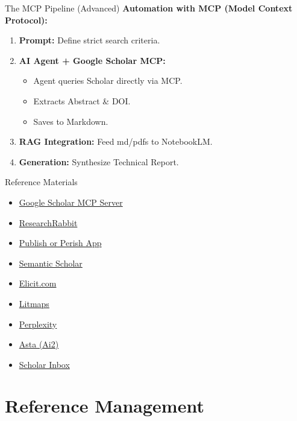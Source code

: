 \documentclass[aspectratio=169]{beamer}
\begin{document}
\begin{frame}[t]{The MCP Pipeline (Advanced)}
    \textbf{Automation with MCP (Model Context Protocol):}
    \begin{enumerate}
        \item \textbf{Prompt:} Define strict search criteria.
        \item \textbf{AI Agent + Google Scholar MCP:} 
        \begin{itemize}
            \item Agent queries Scholar directly via MCP.
            \item Extracts Abstract \& DOI.
            \item Saves to Markdown.
        \end{itemize}
        \item \textbf{RAG Integration:} Feed md/pdfs to NotebookLM.
        \item \textbf{Generation:} Synthesize Technical Report.
    \end{enumerate}
\end{frame}


\begin{frame}[t]{Reference Materials}
    \begin{itemize}
        \item \href{https://smithery.ai/servers/JackKuo666/google-scholar-mcp-server}{Google Scholar MCP Server}
        \item \href{https://www.researchrabbit.ai/}{ResearchRabbit}
        \item \href{https://harzing.com/resources/publish-or-perish}{Publish or Perish App}
        \item \href{https://www.semanticscholar.org/}{Semantic Scholar}
        \item \href{https://elicit.com/}{Elicit.com}
        \item \href{https://www.litmaps.com/}{Litmaps}
        \item \href{https://www.perplexity.ai/}{Perplexity}
        \item \href{https://asta.allen.ai/}{Asta (Ai2)}
        \item \href{https://scholar-inbox.com/}{Scholar Inbox}
    \end{itemize}
\end{frame}


\section{Reference Management}
\end{document}
